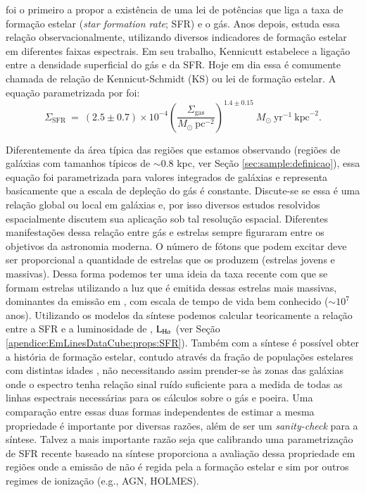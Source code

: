 \citet{Schmidt.1959a} foi o primeiro a propor a existência de uma lei de potências que liga a taxa de formação estelar ({\em star formation rate}; SFR) e o gás. Anos depois, \citet{Kennicutt.1998a} estuda essa relação observacionalmente, utilizando diversos indicadores de formação estelar em diferentes faixas espectrais. Em seu trabalho, Kennicutt estabelece a ligação entre a densidade superficial do gás e da SFR. Hoje em dia essa é comumente chamada de relação de Kennicut-Schmidt (KS) ou lei de formação estelar. A
equação parametrizada por \citeauthor{Kennicutt.1998a} foi:
\begin{equation}
	\Sigma_{\mathrm{SFR}}\ =\ (2.5\pm0.7)\times 10^{-4} \left(\frac{\Sigma_{\mathrm{gas}}}{
M_\odot\ \mathrm{pc}^{-2}}\right)^{1.4 \pm 0.15}\ M_\odot\ \mathrm{yr}^{-1}\ \mathrm{kpc}^{-2}.
	\label{eq:SFRKennicutt}
\end{equation}

Diferentemente da área típica das regiões que estamos observando (regiões de galáxias com tamanhos típicos de $\sim 0.8 $ kpc, ver Seção \ref{sec:sample:definicao}), essa equação foi parametrizada para valores integrados de galáxias e representa basicamente que a escala de depleção do gás é constante. Discute-se se essa é uma relação global \citep{Bigiel.etal.2008a, Blanc.etal.2009, Leroy.etal.2013a} ou local \citep[e.g., dependente da densidade superficial de gás; ][]{Kennicutt.etal.2007a, Liu.etal.2011a, Calzetti.etal.2012a, Shetty.etal.2013} em galáxias e, por isso diversos estudos resolvidos espacialmente discutem sua aplicação sob tal resolução espacial. Diferentes manifestações dessa relação entre gás e estrelas sempre figuraram entre os objetivos da astronomia moderna. O número de fótons que podem excitar \Ha deve ser proporcional a quantidade de estrelas que os produzem (estrelas jovens e massivas). Dessa forma podemos ter uma ideia da taxa recente com que se formam estrelas utilizando a luz que é emitida dessas estrelas mais massivas, dominantes da emissão em \Ha, com escala de tempo de vida bem conhecido ($\sim 10^7$ anos). Utilizando os modelos da síntese podemos calcular teoricamente a relação entre a SFR e a luminosidade de \Ha, $\LHalpha$ (ver Seção \ref{apendice:EmLinesDataCube:props:SFR}). Também com a síntese é possível obter a história de formação estelar, contudo através da fração de populações estelares com distintas idades \citep{Asari.etal.2007a}, não necessitando assim prender-se às zonas das galáxias onde o espectro tenha relação sinal ruído suficiente para a medida de todas as linhas espectrais necessárias para os cálculos sobre o gás e poeira. Uma comparação entre essas duas formas independentes de estimar a mesma propriedade é importante por diversas razões, além de ser um {\em sanity-check} para a síntese. Talvez a mais importante razão seja que calibrando uma parametrização de SFR recente baseado na síntese proporciona a avaliação dessa propriedade em regiões onde a emissão de \Ha não é regida pela a formação estelar e sim por outros regimes de ionização (e.g., AGN, HOLMES).


